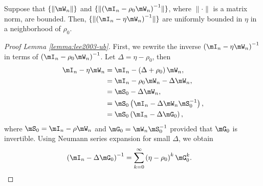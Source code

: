 \documentclass[english,12pt]{book}\usepackage[]{graphicx}\usepackage[]{xcolor}
\begin{document}
\begin{lemma}\label{lemma:lee2003-ub}
Suppose that $\{\lVert \mW_n\rVert\}$ and $\{\lVert \left(\mI_n - \rho_0\mW_n\right)^{-1}\rVert\}$, where $\lVert \cdot \rVert$ is a matrix norm, are bounded. Then, $\{\lVert \left(\mI_n - \eta\mW_n\right)^{-1}\rVert\}$ are uniformly bounded in $\eta$ in a neighborhood of $\rho_0$.
\end{lemma}

\begin{proof}[Proof Lemma \ref{lemma:lee2003-ub}]
First, we rewrite the inverse $\left(\mI_n - \eta\mW_n\right)^{-1}$ in terms of $\left(\mI_n - \rho_0\mW_n\right)^{-1}$. Let $\Delta = \eta-\rho_0$, then
\begin{equation*}
\begin{aligned}
  \mI_n - \eta\mW_n  & = \mI_n - \left(\Delta + \rho_0\right)\mW_n, \\
                     & = \mI_n - \rho_0\mW_n - \Delta \mW_n, \\
                     & = \mS_{0} - \Delta \mW_n, \\
                     & = \mS_{0}\left(\mI_n - \Delta \mW_n\mS_{0}^{-1}\right), \\
                     & = \mS_{0}\left(\mI_n - \Delta \mG_0\right),
  \end{aligned}
\end{equation*}
%
where $\mS_{0} =  \mI_n - \rho\mW_n$ and $\mG_0 = \mW_n\mS_0^{-1}$ provided that $\mG_0$ is invertible.
Using Neumann series expansion for small $\Delta$, we obtain
\begin{equation*}
\begin{aligned}
  \left(\mI_n - \Delta \mG_0\right)^{-1} & = \sum_{k = 0}^{\infty}\left(\eta-\rho_0\right)^k\mG_0^k.
\end{aligned}
\end{equation*}


\end{proof}
\end{document}
